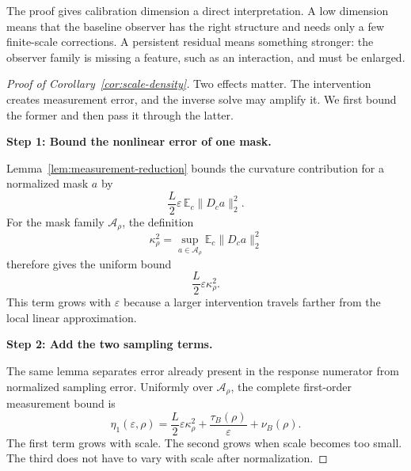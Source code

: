 \documentclass[sigconf,10pt,nonacm,balance=false]{acmart}
\newcommand{\eps}{\varepsilon}
\newcommand{\E}{\mathbb{E}}
\begin{document}
The proof gives calibration dimension a direct interpretation. A low dimension means that the baseline observer has the right structure and needs only a few finite-scale corrections. A persistent residual means something stronger: the observer family is missing a feature, such as an interaction, and must be enlarged.

\begin{proof}[Proof of Corollary~\ref{cor:scale-density}]
Two effects matter. The intervention creates measurement error, and the inverse solve may amplify it. We first bound the former and then pass it through the latter.

\noindent\textbf{Step 1: Bound the nonlinear error of one mask.}\par
Lemma~\ref{lem:measurement-reduction} bounds the curvature contribution for a normalized mask $a$ by
\begin{equation}
    \frac{L}{2}\eps\,\E_c\|D_ca\|_2^2.
\end{equation}
For the mask family $\mathcal A_\rho$, the definition
\[
    \kappa_\rho^2
    =
    \sup_{a\in\mathcal A_\rho}
    \E_c\|D_ca\|_2^2
\]
therefore gives the uniform bound
\begin{equation}
    \frac{L}{2}\eps\kappa_\rho^2.
\end{equation}
This term grows with $\eps$ because a larger intervention travels farther from the local linear approximation.

\noindent\textbf{Step 2: Add the two sampling terms.}\par
The same lemma separates error already present in the response numerator from normalized sampling error. Uniformly over $\mathcal A_\rho$, the complete first-order measurement bound is
\begin{equation}
    \eta_1(\eps,\rho)
    =
    \frac{L}{2}\eps\kappa_\rho^2
    +
    \frac{\tau_B(\rho)}{\eps}
    +
    \nu_B(\rho).
\end{equation}
The first term grows with scale. The second grows when scale becomes too small. The third does not have to vary with scale after normalization.


\end{proof}
\end{document}
